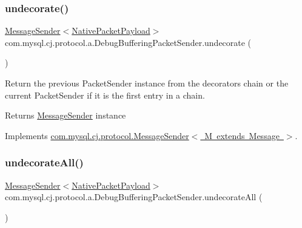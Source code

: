 \subsubsection{\texorpdfstring{undecorate()}{undecorate()}}
{\footnotesize\ttfamily \mbox{\hyperlink{interfacecom_1_1mysql_1_1cj_1_1protocol_1_1_message_sender}{Message\+Sender}}$<$\mbox{\hyperlink{classcom_1_1mysql_1_1cj_1_1protocol_1_1a_1_1_native_packet_payload}{Native\+Packet\+Payload}}$>$ com.\+mysql.\+cj.\+protocol.\+a.\+Debug\+Buffering\+Packet\+Sender.\+undecorate (\begin{DoxyParamCaption}{ }\end{DoxyParamCaption})}

Return the previous Packet\+Sender instance from the decorators chain or the current Packet\+Sender if it is the first entry in a chain.

\begin{DoxyReturn}{Returns}
\mbox{\hyperlink{interfacecom_1_1mysql_1_1cj_1_1protocol_1_1_message_sender}{Message\+Sender}} instance 
\end{DoxyReturn}


Implements \mbox{\hyperlink{interfacecom_1_1mysql_1_1cj_1_1protocol_1_1_message_sender_a3a352bf35ad98dc6cea7c1f4ac9480da}{com.\+mysql.\+cj.\+protocol.\+Message\+Sender$<$ M extends Message $>$}}.

\mbox{\label{classcom_1_1mysql_1_1cj_1_1protocol_1_1a_1_1_debug_buffering_packet_sender_a00c2c86d5ab855c81addbc039560b66b}} 
\subsubsection{\texorpdfstring{undecorate\+All()}{undecorateAll()}}
{\footnotesize\ttfamily \mbox{\hyperlink{interfacecom_1_1mysql_1_1cj_1_1protocol_1_1_message_sender}{Message\+Sender}}$<$\mbox{\hyperlink{classcom_1_1mysql_1_1cj_1_1protocol_1_1a_1_1_native_packet_payload}{Native\+Packet\+Payload}}$>$ com.\+mysql.\+cj.\+protocol.\+a.\+Debug\+Buffering\+Packet\+Sender.\+undecorate\+All (\begin{DoxyParamCaption}{ }\end{DoxyParamCaption})}

